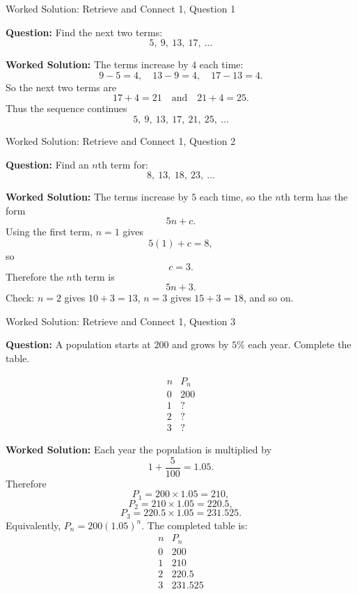 \documentclass{beamer}
\begin{document}
\begin{frame}{Worked Solution: Retrieve and Connect 1, Question 1}
\hypertarget{work-st1}{}

\textbf{Question:} Find the next two terms:
\[
5,\ 9,\ 13,\ 17,\ \dots
\]

\textbf{Worked Solution:} The terms increase by \(4\) each time:
\[
9-5=4,\quad 13-9=4,\quad 17-13=4.
\]
So the next two terms are
\[
17+4=21 \quad \text{and} \quad 21+4=25.
\]
Thus the sequence continues
\[
5,\ 9,\ 13,\ 17,\ 21,\ 25,\ \dots
\]

\end{frame}

\begin{frame}{Worked Solution: Retrieve and Connect 1, Question 2}

\textbf{Question:} Find an \(n\)th term for:
\[
8,\ 13,\ 18,\ 23,\ \dots
\]

\textbf{Worked Solution:} The terms increase by \(5\) each time, so the \(n\)th term has the form
\[
5n + c.
\]
Using the first term, \(n=1\) gives
\[
5(1)+c=8,
\]
so
\[
c=3.
\]
Therefore the \(n\)th term is
\[
5n+3.
\]
Check: \(n=2\) gives \(10+3=13\), \(n=3\) gives \(15+3=18\), and so on.

\end{frame}

\begin{frame}{Worked Solution: Retrieve and Connect 1, Question 3}

\textbf{Question:} A population starts at \(200\) and grows by \(5\%\) each year. Complete the table.

\[
\begin{array}{c|c}
n & P_n \\
\hline
0 & 200 \\
1 & ? \\
2 & ? \\
3 & ?
\end{array}
\]

\textbf{Worked Solution:} Each year the population is multiplied by
\[
1+\frac{5}{100}=1.05.
\]
Therefore
\[
P_1=200 \times 1.05 = 210,
\]
\[
P_2=210 \times 1.05 = 220.5,
\]
\[
P_3=220.5 \times 1.05 = 231.525.
\]
Equivalently, \(P_n=200(1.05)^n\). The completed table is:
\[
\begin{array}{c|c}
n & P_n \\
\hline
0 & 200 \\
1 & 210 \\
2 & 220.5 \\
3 & 231.525
\end{array}
\]

\end{frame}
\end{document}
